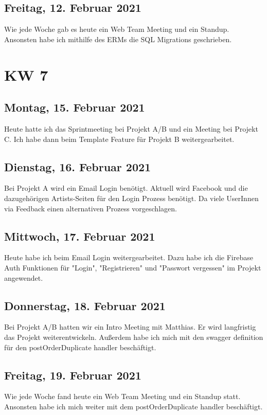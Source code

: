 \section{Freitag, 12. Februar 2021}
Wie jede Woche gab es heute ein Web Team Meeting und ein Standup. Ansonsten habe ich mithilfe des ERMs die SQL Migrations geschrieben.


\chapter{KW 7}

\section{Montag, 15. Februar 2021}
Heute hatte ich das Sprintmeeting bei Projekt A/B und ein Meeting bei Projekt C. Ich habe dann beim Template Feature für Projekt B weitergearbeitet.

\section{Dienstag, 16. Februar 2021}
Bei Projekt A wird ein Email Login benötigt. Aktuell wird Facebook und die dazugehörigen Artists-Seiten für den Login Prozess benötigt. Da viele UserInnen via Feedback einen alternativen Prozess vorgeschlagen.

\section{Mittwoch, 17. Februar 2021}
Heute habe ich beim Email Login weitergearbeitet. Dazu habe ich die Firebase Auth Funktionen für "Login", "Registrieren" und "Passwort vergessen" im Projekt angewendet.

\section{Donnerstag, 18. Februar 2021}
Bei Projekt A/B hatten wir ein Intro Meeting mit Matthias. Er wird langfristig das Projekt weiterentwickeln. Außerdem habe ich mich mit den swagger definition für den postOrderDuplicate handler beschäftigt.

\section{Freitag, 19. Februar 2021}
Wie jede Woche fand heute ein Web Team Meeting und ein Standup statt. Ansonsten habe ich mich weiter mit dem postOrderDuplicate handler beschäftigt.



